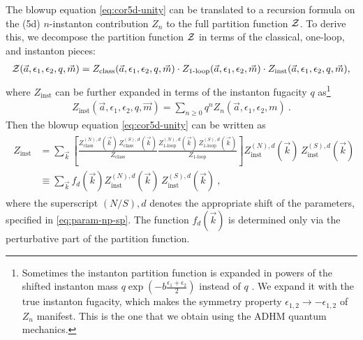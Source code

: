 \documentclass[letterpaper, 11pt]{article}
\def\CZ{{\cal Z}}
\def\e{\epsilon}
\begin{document}
The blowup equation \eqref{eq:cor5d-unity} can be translated to a recursion formula on the (5d) $n$-instanton contribution $Z_n$ to the full partition function $\CZ$.
To derive this, we decompose the partition function $\CZ$ in terms of the classical, one-loop, and instanton pieces: 
\begin{align}
  \CZ(\vec{a}, \e_1, \e_2, q, \vec{m}) = Z_{\textrm{class}}(\vec{a}, \e_1, \e_2, q, \vec{m}) \cdot  Z_{\textrm{1-loop}} (\vec{a}, \e_1, \e_2, \vec{m}) \cdot Z_{\textrm{inst}}(\vec{a}, \e_1, \e_2, q, \vec{m}),
 \end{align}
where $Z_\text{inst}$ can be further expanded in terms of the instanton fugacity $q$ as\footnote{Sometimes the instanton partition function is expanded in powers of the shifted instanton mass $q \exp (-b \frac{\e_1+\e_2}{2})$ instead of $q$ \cite{Nakajima:2005fg, Gottsche:2006bm, Keller:2012da}. We expand it with the true instanton fugacity, which makes the symmetry property $\e_{1, 2} \to - \e_{1, 2}$ of $Z_n$ manifest. This is the one that we obtain using the ADHM quantum mechanics.}
\begin{align}
 Z_{\textrm{inst}} (\vec{a}, \e_1, \e_2, q, \vec{m}) = \sum_{n \ge 0} q^n Z_n (\vec{a}, \e_1, \e_2, m) \ . 
\end{align}
Then the blowup equation \eqref{eq:cor5d-unity} can be written as
\begin{align}
  \label{eq:recur-inst}
  \begin{split}
 Z_{\textrm{inst}} &= \sum_{\vec{k}} \left[ \frac{Z^{(N), d}_{\textrm{class}}(\vec{k}) \, Z^{(S), d}_{\textrm{class}}(\vec{k})}{Z_{\textrm{class}}}  \frac{Z^{(N), d}_{\textrm{1-loop}}(\vec{k})\, Z^{(S), d}_{\textrm{1-loop}}(\vec{k})}{Z_{\textrm{1-loop}}} \right] Z^{(N), d}_{\textrm{inst}}(\vec{k})\, Z^{(S), d}_{\textrm{inst}}(\vec{k}) \\
  &\equiv  \sum_{\vec{k}} f_d(\vec{k}) Z^{(N), d}_{\textrm{inst}}(\vec{k})\, Z^{(S), d}_{\textrm{inst}}(\vec{k}) \ , 
  \end{split}
\end{align}
where the superscript $(N/S),d$ denotes the appropriate shift of the parameters, specified in \eqref{eq:param-np-sp}. The function $f_d(\vec{k})$ is determined only via the perturbative part of the partition function. 
\end{document}
